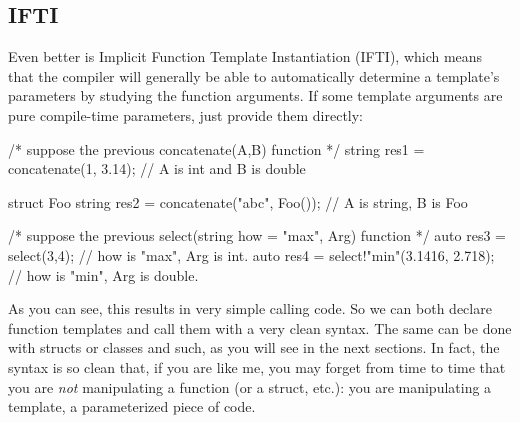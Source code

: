 
\subsection{IFTI}\label{ifti}

Even better is Implicit Function Template Instantiation (IFTI), which means that the compiler will generally be able to automatically determine a template's parameters by studying the function arguments. If some template arguments are pure compile-time parameters, just provide them directly:

\begin{dcode}
/* suppose the previous concatenate(A,B) function */
string res1 = concatenate(1, 3.14); // A is int and B is double

struct Foo {}
string res2 = concatenate("abc", Foo()); // A is string, B is Foo

/* suppose the previous select(string how = "max", Arg) function */
auto res3 = select(3,4); // how is "max", Arg is int.
auto res4 = select!"min"(3.1416, 2.718); // how is "min", Arg is double.
\end{dcode}

As you can see, this results in very simple calling code. So we can both declare function templates and call them with a very clean syntax. The same can be done with structs or classes and such, as you will see in the next sections. In fact, the syntax is so clean that, if you are like me, you may forget from time to time that you are \emph{not} manipulating a function (or a struct, etc.): you are manipulating a template, a parameterized piece of code. 


